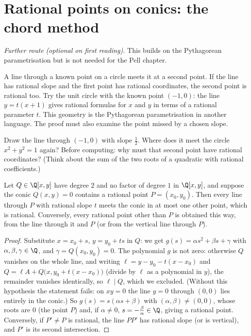 \section{Rational points on conics: the chord method}

\emph{Further route (optional on first reading).} This builds on the
Pythagorean parametrisation but is not needed for the Pell chapter.

A line through a known point on a circle meets it at a second point. If the line has rational slope and the first point has rational coordinates, the second point is rational too. Try the unit circle with the known point $(-1,0)$: the line $y=t(x+1)$ gives rational formulas for $x$ and $y$ in terms of a rational parameter $t$. This geometry is the Pythagorean parametrisation in another language. The proof must also examine the point missed by a chosen slope.

\begin{think}
Draw the line through $(-1,0)$ with slope $\frac12$. Where does it meet the circle $x^2+y^2=1$ again? Before computing: why must that second point have rational coordinates? (Think about the sum of the two roots of a quadratic with rational coefficients.)
\end{think}

\begin{proposition}\label{prop:chord}
Let $Q\in\Q[x,y]$ have degree $2$ and no factor of degree $1$ in $\Q[x,y]$, and suppose the conic $Q(x,y)=0$ contains a rational point $P=(x_0,y_0)$. Then every line through $P$ with rational slope $t$ meets the conic in at most one other point, which is rational. Conversely, every rational point other than $P$ is obtained this way, from the line through it and $P$ (or from the vertical line through $P$).
\end{proposition}
\begin{proof}
Substitute $x=x_0+s$, $y=y_0+ts$ in $Q$: we get $g(s)=\alpha s^2+\beta s+\gamma$ with $\alpha,\beta,\gamma\in\Q$, and $\gamma=Q(x_0,y_0)=0$. The polynomial $g$ is not zero: otherwise $Q$ vanishes on the whole line, and writing $\ell=y-y_0-t(x-x_0)$ and $Q=\ell A+Q\big(x,y_0+t(x-x_0)\big)$ (divide by $\ell$ as a polynomial in $y$), the remainder vanishes identically, so $\ell\mid Q$, which we excluded. (Without this hypothesis the statement fails: on $xy=0$ the line $y=0$ through $(0,0)$ lies entirely in the conic.) So $g(s)=s(\alpha s+\beta)$ with $(\alpha,\beta)\ne(0,0)$, whose roots are $0$ (the point $P$) and, if $\alpha\ne0$, $s=-\frac\beta\alpha\in\Q$, giving a rational point. Conversely, if $P'\ne P$ is rational, the line $PP'$ has rational slope (or is vertical), and $P'$ is its second intersection.
\end{proof}

